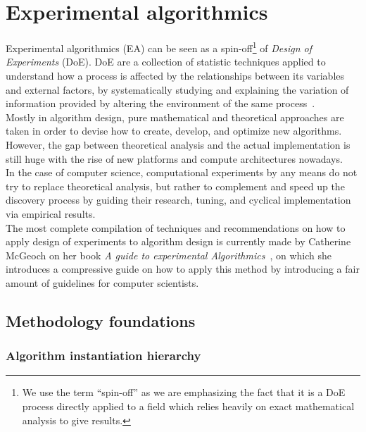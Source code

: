 \section{Experimental algorithmics}
\label{SECTION:EXPERIMENTAL_ALGORITHMICS}

Experimental algorithmics (EA) can be seen as a spin-off\footnote{We use the term ``spin-off'' as we are emphasizing the fact that it is a DoE process directly applied to a field which relies heavily on exact mathematical analysis to give results. } of \textit{Design of Experiments} (DoE). DoE are a collection of statistic techniques applied to understand how a process is affected by the relationships between its variables and external factors, by systematically studying and explaining the variation of information provided by altering the environment of the same process~\cite{Wagner_Mount_Giles_2014}.\\

Mostly in algorithm design, pure mathematical and theoretical approaches are taken in order to devise how to create, develop, and optimize new algorithms. However, the gap between theoretical analysis and the actual implementation is still huge with the rise of new platforms and compute architectures nowadays.\\

In the case of computer science, computational experiments by any means do not try to replace theoretical analysis, but rather to complement and speed up the discovery process by guiding their research, tuning, and cyclical implementation via empirical results.\\

The most complete compilation of techniques and recommendations on how to apply design of experiments to algorithm design is currently made by Catherine McGeoch on her book \textit{A guide to experimental Algorithmics}~\cite{10.5555/2159557}, on which she introduces a compressive guide on how to apply this method by introducing a fair amount of guidelines for computer scientists.\\

\subsection{Methodology foundations}

\subsubsection{Algorithm instantiation hierarchy}

